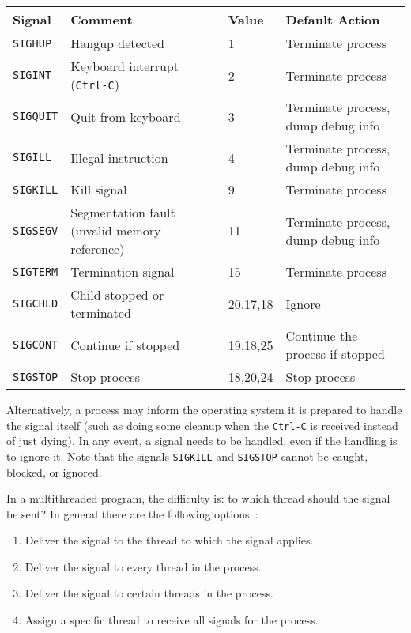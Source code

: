 \begin{center}
\begin{tabular}{l|l|l|l}
	\textbf{Signal} & \textbf{Comment} & \textbf{Value} & \textbf{Default Action}\\ \hline
	\texttt{SIGHUP} & Hangup detected & 1 & Terminate process \\
	\texttt{SIGINT} & Keyboard interrupt (\texttt{Ctrl-C}) & 2 & Terminate process \\
	\texttt{SIGQUIT} & Quit from keyboard & 3 & Terminate process, dump debug info  \\
	\texttt{SIGILL} & Illegal instruction & 4 & Terminate process, dump debug info \\
	\texttt{SIGKILL} & Kill signal & 9 & Terminate process \\
	\texttt{SIGSEGV} & Segmentation fault (invalid memory reference) & 11 & Terminate process, dump debug info\\
	\texttt{SIGTERM} & Termination signal & 15 & Terminate process \\
	\texttt{SIGCHLD} & Child stopped or terminated & 20,17,18 & Ignore \\
	\texttt{SIGCONT} & Continue if stopped & 19,18,25 & Continue the process if stopped \\
	\texttt{SIGSTOP} & Stop process & 18,20,24 & Stop process \\
\end{tabular}
\end{center}


Alternatively, a process may inform the operating system it is prepared to handle the signal itself (such as doing some cleanup when the \texttt{Ctrl-C} is received instead of just dying). In any event, a signal needs to be handled, even if the handling is to ignore it. Note that the signals \texttt{SIGKILL} and \texttt{SIGSTOP} cannot be caught, blocked, or ignored.

In a multithreaded program, the difficulty is: to which thread should the signal be sent? In general there are the following options~\cite{osc}:
\begin{enumerate}
	\item Deliver the signal to the thread to which the signal applies.
	\item Deliver the signal to every thread in the process.
	\item Deliver the signal to certain threads in the process.
	\item Assign a specific thread to receive all signals for the process.
\end{enumerate}

